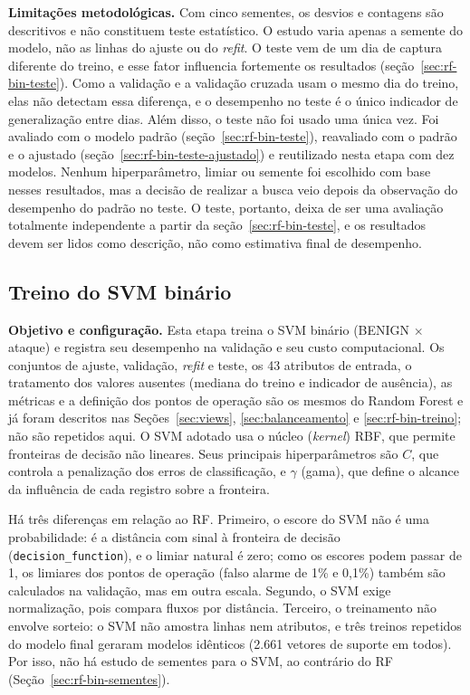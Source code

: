 \documentclass[
    12pt,                %
    openright,           %
    oneside,             %
    a4paper,             %
    english,             %
    brazil               %
]{abntex2}
\begin{document}
\textbf{Limitações metodológicas.} Com cinco sementes, os desvios e contagens são descritivos e não constituem teste estatístico. O estudo varia apenas a semente do modelo, não as linhas do ajuste ou do \textit{refit}. O teste vem de um dia de captura diferente do treino, e esse fator influencia fortemente os resultados (seção~\ref{sec:rf-bin-teste}). Como a validação e a validação cruzada usam o mesmo dia do treino, elas não detectam essa diferença, e o desempenho no teste é o único indicador de generalização entre dias. Além disso, o teste não foi usado uma única vez. Foi avaliado com o modelo padrão (seção~\ref{sec:rf-bin-teste}), reavaliado com o padrão e o ajustado (seção~\ref{sec:rf-bin-teste-ajustado}) e reutilizado nesta etapa com dez modelos. Nenhum hiperparâmetro, limiar ou semente foi escolhido com base nesses resultados, mas a decisão de realizar a busca veio depois da observação do desempenho do padrão no teste. O teste, portanto, deixa de ser uma avaliação totalmente independente a partir da seção~\ref{sec:rf-bin-teste}, e os resultados devem ser lidos como descrição, não como estimativa final de desempenho.


\subsection{Treino do SVM binário}
\label{sec:svm-bin-treino}

\textbf{Objetivo e configuração.} Esta etapa treina o SVM binário (BENIGN $\times$ ataque) e registra seu desempenho na validação e seu custo computacional. Os conjuntos de ajuste, validação, \textit{refit} e teste, os 43 atributos de entrada, o tratamento dos valores ausentes (mediana do treino e indicador de ausência), as métricas e a definição dos pontos de operação são os mesmos do Random Forest e já foram descritos nas Seções~\ref{sec:views}, \ref{sec:balanceamento} e \ref{sec:rf-bin-treino}; não são repetidos aqui. O SVM adotado usa o núcleo (\textit{kernel}) RBF, que permite fronteiras de decisão não lineares. Seus principais hiperparâmetros são $C$, que controla a penalização dos erros de classificação, e $\gamma$ (gama), que define o alcance da influência de cada registro sobre a fronteira.

Há três diferenças em relação ao RF. Primeiro, o escore do SVM não é uma probabilidade: é a distância com sinal à fronteira de decisão (\texttt{decision\_function}), e o limiar natural é zero; como os escores podem passar de 1, os limiares dos pontos de operação (falso alarme de 1\% e 0,1\%) também são calculados na validação, mas em outra escala. Segundo, o SVM exige normalização, pois compara fluxos por distância. Terceiro, o treinamento não envolve sorteio: o SVM não amostra linhas nem atributos, e três treinos repetidos do modelo final geraram modelos idênticos (2.661 vetores de suporte em todos). Por isso, não há estudo de sementes para o SVM, ao contrário do RF (Seção~\ref{sec:rf-bin-sementes}).
\end{document}
